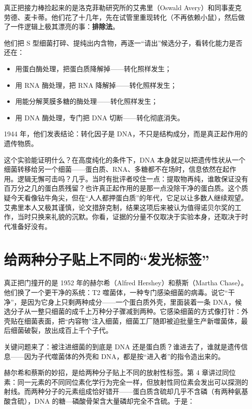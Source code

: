 真正把接力棒捡起来的是洛克菲勒研究所的艾弗里（Oswald Avery）和同事麦克劳德、麦卡蒂。他们花了十几年，先在试管里重现转化（不再依赖小鼠），然后做了一件逻辑上极其漂亮的事：\textbf{排除法}。

他们把 S 型细菌打碎、提纯出内含物，再逐一“请出”候选分子，看转化能力是否还在：

\begin{itemize}[itemsep=2pt]
\item 用蛋白酶处理，把蛋白质降解掉——转化照样发生；
\item 用 RNA 酶处理，把 RNA 降解掉——转化照样发生；
\item 用能分解荚膜多糖的酶处理——转化照样发生；
\item 用 DNA 酶处理，专门把 DNA 切断——转化彻底消失。
\end{itemize}

1944 年，他们发表结论：转化因子是 DNA，不只是结构成分，而是真正起作用的遗传物质。

这个实验能证明什么？在高度纯化的条件下，DNA 本身就足以把遗传性状从一个细菌转移给另一个细菌——蛋白质、RNA、多糖都不在场时，信息依然在起作用。逻辑无懈可击吗？几乎。当时有批评者咬住一点：提取物再纯，谁敢保证没有百万分之几的蛋白质残留？也许真正起作用的是那一点没除干净的蛋白质。这个质疑今天看像钻牛角尖，但在“人人都押蛋白质”的年代，它足以让多数人继续观望。艾弗里本人又极其谨慎，论文措辞克制，结果这项后来被认为值得诺贝尔奖的工作，当时只换来礼貌的沉默。你看，证据的分量不仅取决于实验本身，还取决于时代准备好没有。

\section{给两种分子贴上不同的“发光标签”}

真正把门撞开的是 1952 年的赫尔希（Alfred Hershey）和蔡斯（Martha Chase）。他们换了一个更干净的系统：T2 噬菌体，一种专门感染细菌的病毒。说它“干净”，是因为它身上只剩两种成分——一个蛋白质外壳，里面装着一条 DNA，候选分子从一整只细菌的成千上万种分子骤减到两种。它感染细菌的方式像打针：外壳贴在细菌表面，把“内容物”注入细菌，细菌工厂随即被迫批量生产新噬菌体，最后细菌破裂，放出成百上千个子代。

关键问题来了：被注进细菌的到底是 DNA 还是蛋白质？谁进去了，谁就是遗传信息——因为子代噬菌体的外壳和 DNA，都是按“进入者”的指令造出来的。

赫尔希和蔡斯的妙招，是给两种分子贴上不同的放射性标签。第 4 章讲过同位素：同一元素的不同同位素化学行为完全一样，但放射性同位素会发出可以探测的射线。而两种分子的元素组成恰好错开——蛋白质含硫却几乎不含磷（有两种氨基酸含硫），DNA 的糖—磷酸骨架含大量磷却完全不含硫。于是：

